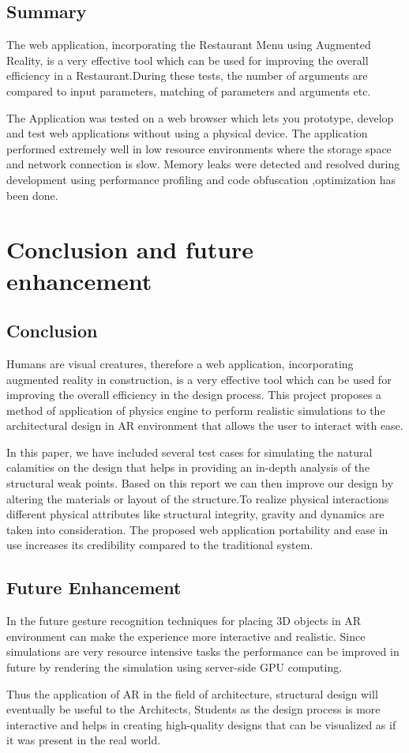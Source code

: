 \documentclass[BTech]{srmuthesis}
\begin{document}
\section{Summary}
The web application, incorporating the Restaurant Menu using Augmented Reality, is a very effective tool
which can be used for improving the overall efficiency in a Restaurant.During these tests, the number of arguments are compared to input parameters, matching of parameters and arguments etc.

The Application was tested on a web browser which lets you prototype, develop and test web applications without using a physical device. The application performed extremely well in low resource environments where the storage space and network connection is slow. Memory leaks were detected and resolved during development using performance profiling and code obfuscation ,optimization has been done.


\chapter{Conclusion and future enhancement}
\section{Conclusion}
Humans are visual creatures, therefore
a web application, incorporating augmented reality in construction, is a very effective tool which can be used for improving the overall efficiency in the design process.
This project proposes a method of application of physics engine to perform realistic simulations to the architectural design in AR environment that allows the user to interact with ease.

In this paper, we have included several test cases for simulating the natural calamities on the design that helps in providing an in-depth analysis of the structural weak points. Based on this report we can then improve our design by altering the materials or layout of the structure.To realize physical interactions different physical attributes like structural integrity, gravity and dynamics are taken into consideration. 
The proposed web application portability and ease in use
increases its credibility compared to the traditional system.
\section{Future Enhancement}
In the future gesture recognition techniques for placing 3D objects in AR environment can make the experience more interactive and realistic.
Since simulations are very resource intensive tasks the performance can be improved in future by rendering the simulation using server-side GPU computing.

Thus the application of AR in the field of architecture, structural design will eventually be useful to the Architects, Students as the design process is more interactive and helps in creating high-quality designs that can be visualized as if it was present in the real world.



\end{document}
